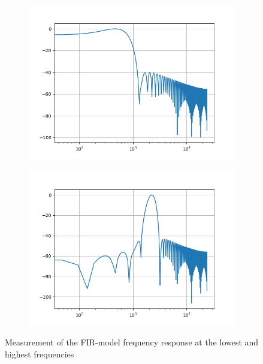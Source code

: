 \begin{figure}[!h]
    \centering
    \begin{subfigure}[c]{0.49\textwidth}
        \centering
        \includegraphics[width=\textwidth]{img/fir_bandpass460.png}
    \end{subfigure}
    \begin{subfigure}[c]{0.49\textwidth}
        \centering
        \includegraphics[width=\textwidth]{img/fir_bandpass2242.png}
    \end{subfigure}
    \caption{Measurement of the \ac{FIR}-model frequency response at the lowest and highest frequencies}
    \label{fig:wahwah-fir}
\end{figure}


